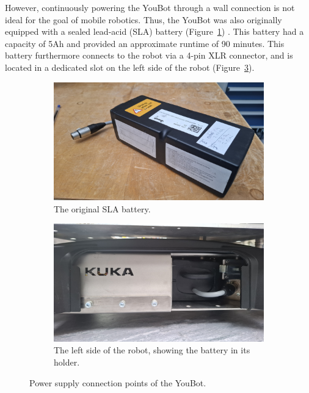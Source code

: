 \documentclass[a4paper, 12pt]{article}
\begin{document}
    However, continuously powering the YouBot through a wall connection is not ideal for the goal of mobile robotics. Thus, the YouBot was also originally equipped with a sealed lead-acid (SLA) battery (Figure~\ref{fig:youbot-battery}) . This battery had a capacity of 5Ah and provided an approximate runtime of 90 minutes. This battery furthermore connects to the robot via a 4-pin XLR connector, and is located in a dedicated slot on the left side of the robot (Figure~\ref{fig:youbot-battery-holder}). %

    \begin{figure}[H]
        \centering
        \begin{subfigure}[t]{0.49\linewidth}
            \centering
            \includegraphics[width=\linewidth]{images/sec2/youbot_battery.jpg}
            \caption{The original SLA battery.}
            \label{fig:youbot-battery}
        \end{subfigure}
        \hfill
        \begin{subfigure}[t]{0.49\linewidth}
            \centering
            \includegraphics[width=\linewidth]{images/sec2/youbot_battery_holder.jpg}
            \caption{The left side of the robot, showing the battery in its holder.}
            \label{fig:youbot-battery-holder}
        \end{subfigure}
        \caption{Power supply connection points of the YouBot.}
    \end{figure}
\end{document}
